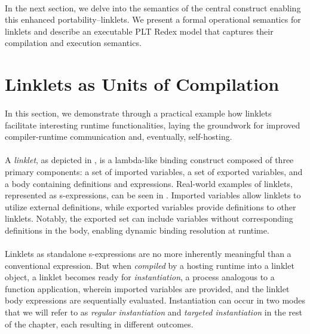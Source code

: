 		\paragraph{}%
			In the next section, we delve into the semantics of the central construct enabling this enhanced portability--linklets. We present a formal operational semantics for linklets and describe an executable PLT Redex model that captures their compilation and execution semantics.

	\section[\texorpdfstring{Linklets as Units of Compilation}{Example Use: REPL}]{Linklets as Units of Compilation}
		\label{section:linklet-semantics}

		\paragraph{}%
			In this section, we demonstrate through a practical example how linklets facilitate interesting runtime functionalities, laying the groundwork for improved compiler-runtime communication and, eventually, self-hosting.


		\paragraph{}%
			A \emph{linklet}, as depicted in , is a lambda-like binding construct composed of three primary components: a set of imported variables, a set of exported variables, and a body containing definitions and expressions. Real-world examples of linklets, represented as s-expressions, can be seen in . Imported variables allow linklets to utilize external definitions, while exported variables provide definitions to other linklets. Notably, the exported set can include variables without corresponding definitions in the body, enabling dynamic binding resolution at runtime.

		\paragraph{}%
			Linklets as standalone s-expressions are no more inherently meaningful than a conventional  expression. But when \emph{compiled} by a hosting runtime into a linklet object, a linklet becomes ready for \emph{instantiation}, a process analogous to a function application, wherein imported variables are provided, and the linklet body expressions are sequentially evaluated. Instantiation can occur in two modes that we will refer to as \emph{regular instantiation} and \emph{targeted instantiation} in the rest of the chapter, each resulting in different outcomes.

